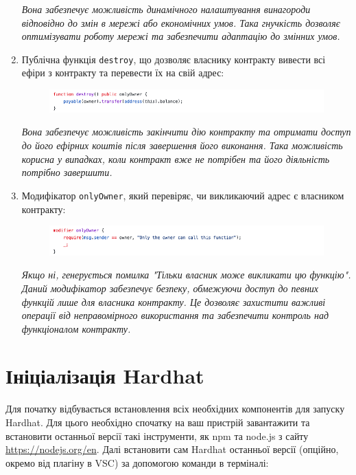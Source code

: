 \begin{enumerate}
    \textit{Вона забезпечує можливість динамічного налаштування винагороди відповідно до змін в мережі або економічних умов. Така гнучкість дозволяє оптимізувати роботу мережі та забезпечити адаптацію до змінних умов.}

    \newpage
    \item Публічна функція \texttt{destroy}, що дозволяє власнику контракту вивести всі ефіри з контракту та перевести їх на свій адрес:

    \begin{figure}[ht]
        \centering
        \includegraphics[scale=0.6]{IMAGES/code6.png}
        \label{fig_vsc}
    \end{figure}

    \textit{Вона забезпечує можливість закінчити дію контракту та отримати доступ до його ефірних коштів після завершення його виконання. Така можливість корисна у випадках, коли контракт вже не потрібен та його діяльність потрібно завершити.}

    \item Модифікатор \texttt{onlyOwner}, який перевіряє, чи викликаючий адрес є власником контракту:

    \begin{figure}[ht]
        \centering
        \includegraphics[scale=0.6]{IMAGES/code7.png}
        \label{fig_vsc}
    \end{figure}

    \textit{Якщо ні, генерується помилка "Тільки власник може викликати цю функцію". Даний модифікатор забезпечує безпеку, обмежуючи доступ до певних функцій лише для власника контракту. Це дозволяє захистити важливі операції від неправомірного використання та забезпечити контроль над функціоналом контракту.}
    
\end{enumerate}

\newpage

\section{Ініціалізація Hardhat}

Для початку відбувається встановлення всіх необхідних компонентів для запуску Hardhat. Для цього необхідно спочатку на ваш пристрій завантажити та встановити останньої версії такі інструменти, як npm та node.js з сайту \url{https://nodejs.org/en}. Далі встановити сам Hardhat останньої версії (опційно, окремо від плагіну в VSC) за допомогою команди в терміналі:

